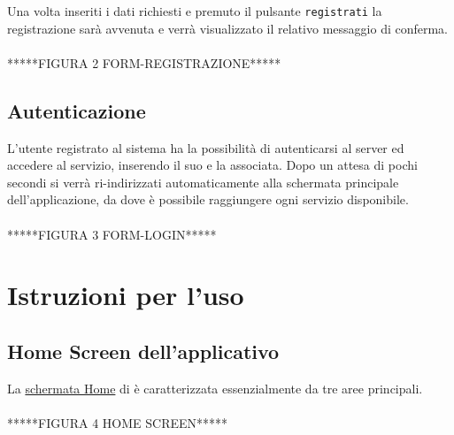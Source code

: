 Una volta inseriti i dati richiesti e premuto il pulsante \texttt{registrati} la registrazione sarà avvenuta e verrà visualizzato il relativo messaggio di conferma.
\\\\*****FIGURA 2 FORM-REGISTRAZIONE*****

\subsection{Autenticazione}
L'utente registrato al sistema ha la possibilità di autenticarsi al server \caName{} ed accedere al servizio, inserendo il suo  e la  associata.
Dopo un attesa di pochi secondi si verrà ri-indirizzati automaticamente alla schermata principale dell'applicazione, da dove è possibile raggiungere ogni servizio disponibile.
\\\\*****FIGURA 3 FORM-LOGIN*****

\section{Istruzioni per l'uso}
\subsection{Home Screen dell'applicativo }
La \underline{schermata Home} di \caName{} è caratterizzata essenzialmente da tre aree principali.
\\\\*****FIGURA 4 HOME SCREEN*****

